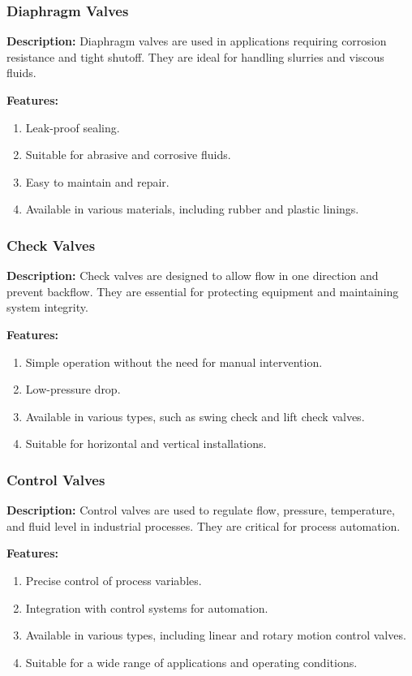 \subsubsection{Diaphragm Valves}

\textbf{Description:} Diaphragm valves are used in applications requiring corrosion resistance and tight shutoff. They are ideal for handling slurries and viscous fluids.

\textbf{Features:}
\begin{enumerate}
    \item Leak-proof sealing.
    \item Suitable for abrasive and corrosive fluids.
    \item Easy to maintain and repair.
    \item Available in various materials, including rubber and plastic linings.
\end{enumerate}
\subsubsection{Check Valves}

\textbf{Description:} Check valves are designed to allow flow in one direction and prevent backflow. They are essential for protecting equipment and maintaining system integrity.

\textbf{Features:}
\begin{enumerate}
    \item Simple operation without the need for manual intervention.
    \item Low-pressure drop.
    \item Available in various types, such as swing check and lift check valves.
    \item Suitable for horizontal and vertical installations.
\end{enumerate}

\subsubsection{Control Valves}

\textbf{Description:} Control valves are used to regulate flow, pressure, temperature, and fluid level in industrial processes. They are critical for process automation.

\textbf{Features:}
\begin{enumerate}
    \item Precise control of process variables.
    \item Integration with control systems for automation.
    \item Available in various types, including linear and rotary motion control valves.
    \item Suitable for a wide range of applications and operating conditions.
\end{enumerate}